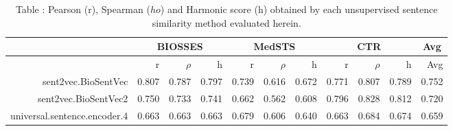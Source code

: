 

\begin{table}[!h]
\centering
\caption{Table \label{table:BioSentenceSimFinalRawOutputFiles}: Pearson (r), Spearman ($
ho$) and Harmonic score (h) obtained by each unsupervised sentence similarity method evaluated herein.} 
\begingroup\tiny
\begin{tabular}{rrrrrrrrrrr}
  \hline \multicolumn{1}{c}{ } & \multicolumn{3}{c}{BIOSSES} & \multicolumn{3}{c}{MedSTS} & \multicolumn{3}{c}{CTR} & \multicolumn{1}{c}{Avg} \\  \hline
 & r & $\rho$ & h & r & $\rho$ & h & r & $\rho$ & h & Avg \\ 
  \hline
sent2vec.BioSentVec & 0.807 & 0.787 & 0.797 & 0.739 & 0.616 & 0.672 & 0.771 & 0.807 & 0.789 & 0.752 \\ 
  sent2vec.BioSentVec2 & 0.750 & 0.733 & 0.741 & 0.662 & 0.562 & 0.608 & 0.796 & 0.828 & 0.812 & 0.720 \\ 
  universal.sentence.encoder.4 & 0.663 & 0.663 & 0.663 & 0.679 & 0.606 & 0.640 & 0.663 & 0.684 & 0.674 & 0.659 \\ 
   \hline
\end{tabular}
\endgroup
\end{table}
